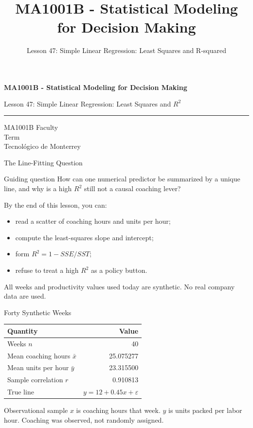 \documentclass[aspectratio=169,10pt,english]{beamer}
\title{MA1001B - Statistical Modeling for Decision Making}
\subtitle{Lesson 47: Simple Linear Regression: Least Squares and R-squared}
\author{}
\institute{Tecnol\'ogico de Monterrey}
\date{}
\begin{document}
\begin{frame}[plain]
  \vspace{1.2cm}
  {\Large\bfseries MA1001B - Statistical Modeling for Decision Making\par}
  \vspace{0.7cm}
  {\large Lesson 47: Simple Linear Regression: Least Squares and $R^2$\par}
  \vspace{0.7cm}
  {\color{TecRojo}\rule{\textwidth}{1.2pt}}
  \vspace{0.8cm}

  MA1001B Faculty\\[0.3cm]
  Term\\[0.3cm]
  Tecnol\'ogico de Monterrey
\end{frame}

\begin{frame}{The Line-Fitting Question}
  \begin{alertblock}{Guiding question}
    How can one numerical predictor be summarized by a unique line, and why
    is a high $R^2$ still not a causal coaching lever?
  \end{alertblock}

  \vspace{0.6em}
  By the end of this lesson, you can:
  \begin{itemize}
    \item read a scatter of coaching hours and units per hour;
    \item compute the least-squares slope and intercept;
    \item form $R^2=1-SSE/SST$;
    \item refuse to treat a high $R^2$ as a policy button.
  \end{itemize}

  \vfill
  \scriptsize All weeks and productivity values used today are synthetic. No real company data are used.
\end{frame}

\begin{frame}{Forty Synthetic Weeks}
  \small
  \begin{center}
    \begin{tabular}{lr}
      \toprule
      \textbf{Quantity} & \textbf{Value} \\
      \midrule
      Weeks $n$ & 40 \\
      Mean coaching hours $\bar x$ & 25.075277 \\
      Mean units per hour $\bar y$ & 23.315500 \\
      Sample correlation $r$ & 0.910813 \\
      True line & $y=12+0.45x+\varepsilon$ \\
      \bottomrule
    \end{tabular}
  \end{center}

  \vspace{0.5em}
  \begin{exampleblock}{Observational sample}
    $x$ is coaching hours that week. $y$ is units packed per labor hour.
    Coaching was observed, not randomly assigned.
  \end{exampleblock}
\end{frame}
\end{document}

